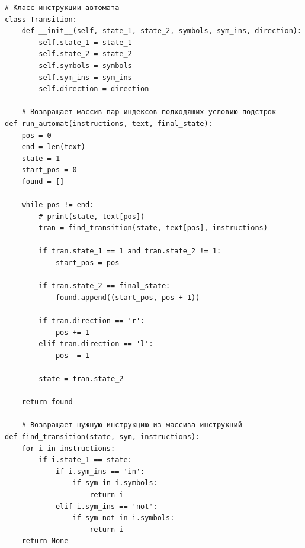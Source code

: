 \documentclass[a4paper, 14pt]{article}
\begin{document}
		\begin{lstlisting}[label=some-code,caption=Класс и функции для работы с автоматом]
		# Класс инструкции автомата
class Transition:
    def __init__(self, state_1, state_2, symbols, sym_ins, direction):
        self.state_1 = state_1
        self.state_2 = state_2
        self.symbols = symbols
        self.sym_ins = sym_ins
        self.direction = direction
        
    # Возвращает массив пар индексов подходящих условию подстрок
def run_automat(instructions, text, final_state):
    pos = 0
    end = len(text)
    state = 1
    start_pos = 0
    found = []

    while pos != end:
        # print(state, text[pos])
        tran = find_transition(state, text[pos], instructions)

        if tran.state_1 == 1 and tran.state_2 != 1:
            start_pos = pos

        if tran.state_2 == final_state:
            found.append((start_pos, pos + 1))

        if tran.direction == 'r':
            pos += 1
        elif tran.direction == 'l':
            pos -= 1

        state = tran.state_2

    return found
    
    # Возвращает нужную инструкцию из массива инструкций
def find_transition(state, sym, instructions):
    for i in instructions:
        if i.state_1 == state:
            if i.sym_ins == 'in':
                if sym in i.symbols:
                    return i
            elif i.sym_ins == 'not':
                if sym not in i.symbols:
                    return i
    return None
		\end{lstlisting}
		\newpage
\end{document}
